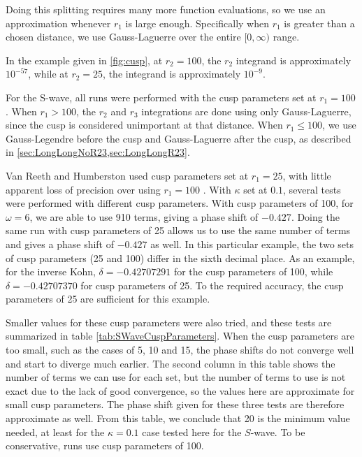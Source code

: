\documentclass[Dissertation.tex]{subfiles}
\begin{document}
Doing this splitting requires many more function evaluations, so we use an 
approximation whenever $r_1$ is large enough. Specifically when $r_1$ is 
greater than a chosen distance, we use Gauss-Laguerre over the entire
$[0,\infty)$ range. 



In the example given in \cref{fig:cusp}, at $r_2 = 100$, the $r_2$ integrand 
is approximately $10^{-57}$, while at $r_2 = 25$, the integrand is 
approximately $10^{-9}$.


For the S-wave, all runs were performed with the cusp parameters set at
$r_1 = 100$. When $r_1 > 100$, the $r_2$ and $r_3$ integrations are done using only 
Gauss-Laguerre, since the cusp is considered unimportant at that distance. 
When $r_1 \leq 100$, we use Gauss-Legendre before the cusp and Gauss-Laguerre 
after the cusp, as described in \cref{sec:LongLongNoR23,sec:LongLongR23}. 

Van Reeth and Humberston used cusp parameters set at $r_1 = 25$, with little 
apparent loss of precision over using $r_1 = 100$ \cite{VanReethPrivate}. 
With $\kappa$ set at $0.1$, several tests were performed with different cusp 
parameters. With cusp parameters of 100, for $\omega = 6$, we are able to use 
910 terms, giving a phase shift of $-0.427$. Doing the same run with cusp 
parameters of 25 allows us to use the same number of terms and gives a phase 
shift of $-0.427$ as well. In this particular example, the two sets of cusp 
parameters (25 and 100) differ in the sixth decimal place. As an example, for 
the inverse Kohn, $\delta = -0.42707291$ for the cusp parameters of 100, 
while $\delta = -0.42707370$ for cusp parameters of 25. To the required 
accuracy, the cusp parameters of 25 are sufficient for this example.

Smaller values for these cusp parameters were also tried, and these tests are 
summarized in table \ref{tab:SWaveCuspParameters}. When the cusp parameters 
are too small, such as the cases of 5, 10 and 15, the phase shifts do not 
converge well and start to diverge much earlier. The second column in this 
table shows the number of terms we can use for each set, but the number of 
terms to use is not exact due to the lack of good convergence, so the values 
here are approximate for small cusp parameters. The phase shift given for 
these three tests are therefore approximate as well. From this table, we 
conclude that 20 is the minimum value needed, at least for the $\kappa = 0.1$ 
case tested here for the $S$-wave. To be conservative, runs use cusp 
parameters of 100. 
\end{document}
